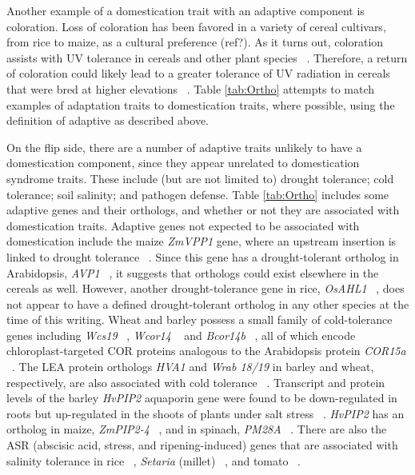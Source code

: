 \documentclass[12pt]{article}
\begin{document}
Another example of a domestication trait with an adaptive component is coloration. Loss of coloration has been favored in a variety of cereal cultivars, from rice to maize, as a cultural preference (ref?). As it turns out, coloration assists with UV tolerance in cereals and other plant species ~\citep{pmid8058838, Gould2004}. Therefore, a return of coloration could likely lead to a greater tolerance of UV radiation in cereals that were bred at higher elevations ~\citep{Pyhjrvi2013}.  Table \ref{tab:Ortho} attempts to match examples of adaptation traits to domestication traits, where possible, using the definition of adaptive as described above. 

On the flip side, there are a number of adaptive traits unlikely to have a domestication component, since they appear unrelated to domestication syndrome traits. These include (but are not limited to) drought tolerance; cold tolerance; soil salinity; and pathogen defense.  Table \ref{tab:Ortho} includes some adaptive genes and their orthologs, and whether or not they are associated with domestication traits.  Adaptive genes not expected to be associated with domestication include the maize \textit{ZmVPP1} gene, where an upstream insertion is linked to drought tolerance ~\citep{Wang2016}.  Since this gene has a drought-tolerant ortholog in Arabidopsis, \textit{AVP1} ~\citep{Gaxiola2001}, it suggests that orthologs could exist elsewhere in the cereals as well. However, another drought-tolerance gene in rice, \textit{OsAHL1} ~\citep{Zhou2016}, does not appear to have a defined drought-tolerant ortholog in any other species at the time of this writing. Wheat and barley possess a small family of cold-tolerance genes including \textit{Wcs19} ~\citep{pmid8219063}, \textit{Wcor14} ~\citep{pmid10846621} and \textit{Bcor14b} ~\citep{pmid9952464}, all of which encode chloroplast-targeted COR proteins analogous to the Arabidopsis protein \textit{COR15a}  ~\citep{pmid9826741, Takumi2003}. The LEA protein orthologs \textit{HVA1} and \textit{Wrab 18/19} in barley and wheat, respectively, are also associated with cold tolerance ~\citep{Hong1988, pmid16755132}. Transcript and protein levels of the barley \textit{HvPIP2} aquaporin gene were found to be down-regulated in roots but up-regulated in the shoots of plants under salt stress ~\citep{Katsuhara2002}.  \textit{HvPIP2} has an ortholog in maize, \textit{ZmPIP2-4} ~\citep{Zhu2005}, and in spinach, \textit{PM28A} ~\citep{Fotiadis2000}. There are also the ASR (abscisic acid, stress, and ripening-induced) genes that are associated with salinity tolerance in rice ~\citep{Joo2013}, \textit{Setaria} (millet) ~\citep{Li2017}, and tomato ~\citep{Konrad2008}. 
\end{document}
